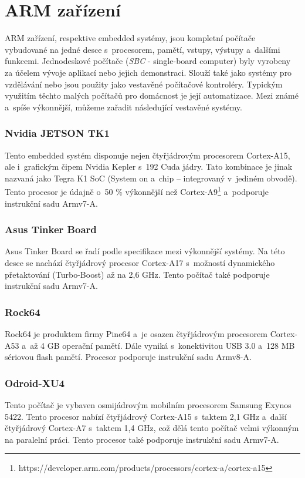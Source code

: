 \section{ARM zařízení}
ARM zařízení, respektive embedded systémy, jsou kompletní počítače vybudované na jedné desce s~procesorem, pamětí, vstupy, výstupy a~dalšími funkcemi. Jednodeskové počítače (\textit{SBC} - single-board computer) byly vyrobeny za účelem vývoje aplikací nebo jejich demonstraci. Slouží také jako systémy pro vzdělávání nebo jsou použity jako vestavěné počítačové kontroléry. Typickým využitím těchto malých počítačů pro domácnost je její automatizace. 
Mezi známé a~spíše výkonnější, můžeme zařadit následující vestavěné systémy.

\subsubsection*{Nvidia JETSON TK1}
Tento embedded systém disponuje nejen čtyřjádrovým procesorem Cortex-A15, ale i~grafickým čipem Nvidia Kepler s~192 Cuda jádry. Tato kombinace je jinak nazvaná jako Tegra K1 SoC (System on a~chip – integrovaný v~jediném obvodě). Tento procesor je údajně o~50 \% výkonnější než Cortex-A9\footnote{https://developer.arm.com/products/processors/cortex-a/cortex-a15} a~podporuje instrukční sadu Armv7-A.

\subsubsection*{Asus Tinker Board}
Asus Tinker Board se řadí podle specifikace mezi výkonnější systémy. Na této desce se nachází čtyřjádrový procesor Cortex-A17 s~možností dynamického přetaktování (Turbo-Boost) až na 2,6 GHz. Tento počítač také podporuje instrukční sadu Armv7-A.  

\subsubsection*{Rock64}
Rock64 je produktem firmy Pine64 a~je osazen čtyřjádrovým procesorem Cortex-A53 a~až 4 GB operační pamětí. Dále vyniká s~konektivitou USB 3.0 a~128 MB sériovou flash pamětí. Procesor podporuje instrukční sadu Armv8-A.

\subsubsection*{Odroid-XU4}
Tento počítač je vybaven osmijádrovým mobilním procesorem Samsung Exynos 5422. Tento procesor nabízí čtyřjádrový Cortex-A15 s~taktem 2,1 GHz a~další čtyřjádrový Cortex-A7 s~taktem 1,4 GHz, což dělá tento počítač velmi výkonným na paralelní práci. Tento procesor také podporuje instrukční sadu Armv7-A.

